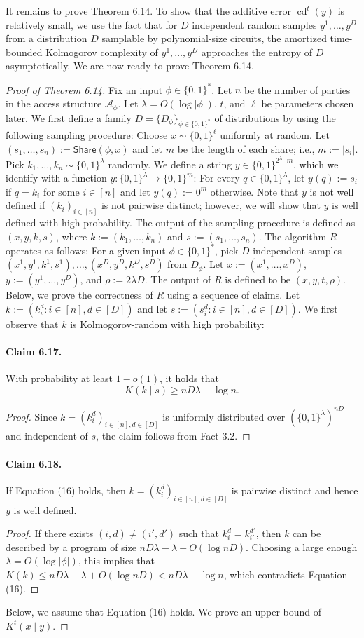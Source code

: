 It remains to prove Theorem 6.14. To show that the additive error $\operatorname{cd}^t(y)$ is relatively small, we use the fact that for $D$ independent random samples $y^1,\ldots,y^D$ from a distribution $D$ samplable by polynomial-size circuits, the amortized time-bounded Kolmogorov complexity of $y^1,\ldots,y^D$ approaches the entropy of $D$ asymptotically.
We are now ready to prove Theorem 6.14.
\begin{proof}[Proof of Theorem 6.14]
Fix an input $\phi\in\{0,1\}^*$. Let $n$ be the number of parties in the access structure $\mathcal A_\phi$. Let $\lambda=O(\log|\phi|)$, $t$, and $\ell$ be parameters chosen later.
We first define a family $D=\{D_\phi\}_{\phi\in\{0,1\}^*}$ of distributions by using the following sampling procedure: Choose $x\sim\{0,1\}^\ell$ uniformly at random. Let $(s_1,\ldots,s_n):=\mathsf{Share}(\phi,x)$ and let $m$ be the length of each share; i.e., $m:=|s_i|$. Pick $k_1,\ldots,k_n\sim\{0,1\}^\lambda$ randomly. We define a string $y\in\{0,1\}^{2^\lambda\cdot m}$, which we identify with a function $y:\{0,1\}^\lambda\to\{0,1\}^m$: For every $q\in\{0,1\}^\lambda$, let $y(q):=s_i$ if $q=k_i$ for some $i\in[n]$ and let $y(q):=0^m$ otherwise. Note that $y$ is not well defined if $(k_i)_{i\in[n]}$ is not pairwise distinct; however, we will show that $y$ is well defined with high probability. The output of the sampling procedure is defined as $(x,y,k,s)$, where $k:=(k_1,\ldots,k_n)$ and $s:=(s_1,\ldots,s_n)$.
The algorithm $R$ operates as follows: For a given input $\phi\in\{0,1\}^*$, pick $D$ independent samples $(x^1,y^1,k^1,s^1),\ldots,(x^D,y^D,k^D,s^D)$ from $D_\phi$. Let $x:=(x^1,\ldots,x^D)$, $y:=(y^1,\ldots,y^D)$, and $\rho:=2\lambda D$. The output of $R$ is defined to be $(x,y,t,\rho)$.
Below, we prove the correctness of $R$ using a sequence of claims. Let $k:=(k_i^d:i\in[n],d\in[D])$ and let $s:=(s_i^d:i\in[n],d\in[D])$. We first observe that $k$ is Kolmogorov-random with high probability:
\paragraph{Claim 6.17.}
With probability at least $1-o(1)$, it holds that
\[K(k\mid s)\geq nD\lambda-\log n.\tag{16}\]
\begin{proof}
Since $k=(k_i^d)_{i\in[n],d\in[D]}$ is uniformly distributed over $(\{0,1\}^\lambda)^{nD}$ and independent of $s$, the claim follows from Fact 3.2.
\end{proof}
\paragraph{Claim 6.18.}
If Equation (16) holds, then $k=(k_i^d)_{i\in[n],d\in[D]}$ is pairwise distinct and hence $y$ is well defined.
\begin{proof}
If there exists $(i,d)\neq(i',d')$ such that $k_i^d=k_{i'}^{d'}$, then $k$ can be described by a program of size $nD\lambda-\lambda+O(\log nD)$. Choosing a large enough $\lambda=O(\log|\phi|)$, this implies that $K(k)\leq nD\lambda-\lambda+O(\log nD)<nD\lambda-\log n$, which contradicts Equation (16).
\end{proof}
Below, we assume that Equation (16) holds. We prove an upper bound of $K^t(x\mid y)$.

\end{proof}
